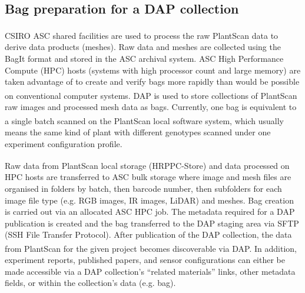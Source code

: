 \documentclass{llncs}
\begin{document}
\subsection{Bag preparation for a DAP collection}


CSIRO ASC shared facilities \cite{ASC} are used to process the raw
PlantScan\textsuperscript{\texttrademark} data to derive data products (meshes).
Raw data and meshes are collected using the BagIt format \cite{Kunze2011} and
stored in the ASC archival system. ASC High Performance Compute (HPC) hosts
(systems with high processor count and large memory) are taken advantage of to
create and verify bags more rapidly than would be possible on conventional
computer systems. DAP is used to store collections of
PlantScan\textsuperscript{\texttrademark} 
raw images and processed mesh data as bags. Currently, one bag is equivalent to
a single batch scanned on the
PlantScan\textsuperscript{\texttrademark}
local software system, which usually means the same kind of plant with different
genotypes scanned under one  experiment configuration profile.  


Raw data from
PlantScan\textsuperscript{\texttrademark} 
local storage (HRPPC-Store) and data processed on HPC hosts are transferred to
ASC bulk storage where image and mesh files are organised in folders by batch,
then barcode number, then subfolders for each image file type (e.g. RGB images,
IR images, LiDAR) and meshes. Bag creation is carried out via an allocated ASC
HPC job.
The metadata required for a DAP publication is created and the bag transferred
to the DAP staging area via SFTP (SSH File Transfer Protocol). After publication
of the DAP collection, the data from PlantScan\textsuperscript{\texttrademark}
for the given project becomes
discoverable via DAP. In addition, experiment reports, published papers, and
sensor configurations can either be made accessible via a DAP collection's
``related materials'' links, other metadata fields, or within the collection's
data (e.g. bag).
\end{document}
